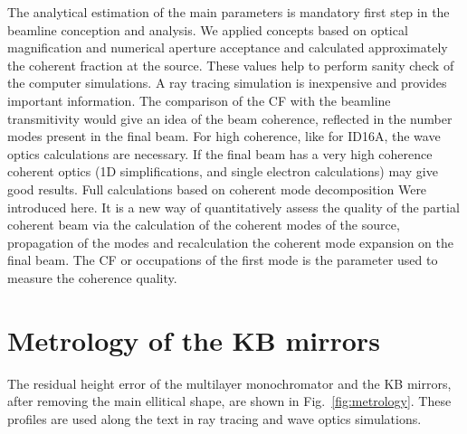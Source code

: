\documentclass{iucr}              %
\newcommand{\todo}[1]{{\color{red}[TODO: "#1'']}}
\begin{document}
The analytical estimation of the main parameters is mandatory first step in the beamline conception and analysis. We applied concepts based on optical magnification and numerical aperture acceptance and calculated approximately the coherent fraction at the source. These values help to perform sanity check of the computer simulations. A ray tracing simulation is inexpensive and provides important information. The comparison of the CF with the beamline transmitivity would give an idea of the beam coherence, reflected in the number modes present in the final beam. For high coherence, like for ID16A, the wave optics calculations are necessary. If the final beam has a very high coherence coherent optics (1D simplifications, and single electron calculations) may give good results. Full calculations based on coherent mode decomposition Were introduced here. It is a new way of quantitatively assess the quality of the partial coherent beam via the calculation of the coherent modes of the source, propagation of the modes and recalculation the coherent mode expansion on the final beam. The CF or occupations of the first mode is the parameter used to measure the coherence quality. 



% 


\ack{\todo{someone to thank?}}

\appendix

\section{Metrology of the KB mirrors}
\label{appendix:metrology}
The residual height error of the multilayer monochromator and the KB mirrors, after removing the main ellitical shape, are shown in Fig.~\ref{fig:metrology}. These profiles are used along the text in ray tracing and wave optics simulations.
\end{document}
